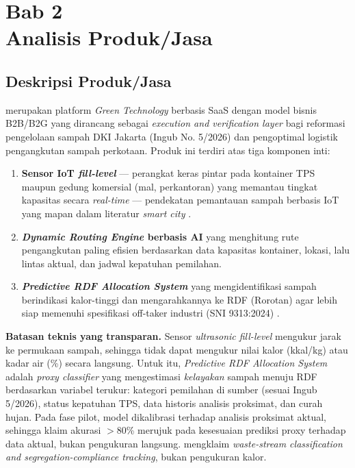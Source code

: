 \section{Bab 2\\Analisis Produk/Jasa}

\subsection{Deskripsi Produk/Jasa}
\label{sec:2-1}

\ProductName{} merupakan platform \textit{Green Technology} berbasis SaaS dengan model bisnis B2B/B2G yang dirancang sebagai \textit{execution and verification layer} bagi reformasi pengelolaan sampah DKI Jakarta (Ingub No. 5/2026) dan pengoptimal logistik pengangkutan sampah perkotaan. Produk ini terdiri atas tiga komponen inti:
\begin{enumerate}[leftmargin=1.5cm]
  \item \textbf{Sensor IoT \textit{fill-level}} --- perangkat keras pintar pada kontainer TPS maupun gedung komersial (mal, perkantoran) yang memantau tingkat kapasitas secara \textit{real-time} --- pendekatan pemantauan sampah berbasis IoT yang mapan dalam literatur \textit{smart city} \parencite{anagnostopoulos2017}.
  \item \textbf{\textit{Dynamic Routing Engine} berbasis AI} yang menghitung rute pengangkutan paling efisien berdasarkan data kapasitas kontainer, lokasi, lalu lintas aktual, dan jadwal kepatuhan pemilahan.
  \item \textbf{\textit{Predictive RDF Allocation System}} yang mengidentifikasi sampah berindikasi kalor-tinggi dan mengarahkannya ke RDF (Rorotan) agar lebih siap memenuhi spesifikasi off-taker industri (SNI 9313:2024) \parencite{sni9313}.
\end{enumerate}

\textbf{Batasan teknis yang transparan.} Sensor \textit{ultrasonic fill-level} mengukur jarak ke permukaan sampah, sehingga tidak dapat mengukur nilai kalor (kkal/kg) atau kadar air (\%) secara langsung. Untuk itu, \textit{Predictive RDF Allocation System} adalah \textit{proxy classifier} yang mengestimasi \textit{kelayakan} sampah menuju RDF berdasarkan variabel terukur: kategori pemilahan di sumber (sesuai Ingub 5/2026), status kepatuhan TPS, data historis analisis proksimat, dan curah hujan. Pada fase pilot, model dikalibrasi terhadap analisis proksimat aktual, sehingga klaim akurasi $>$80\% merujuk pada kesesuaian prediksi proxy terhadap data aktual, bukan pengukuran langsung. \ProductName{} mengklaim \textit{waste-stream classification and segregation-compliance tracking}, bukan pengukuran kalor.

